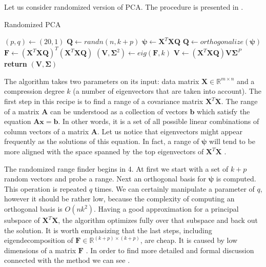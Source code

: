 Let us consider randomized version of PCA. The procedure is presented in  . 
\begin{algorithm}
    \caption{Randomized PCA}\label{alg:rpca1}
    \begin{algorithmic}[1]
        \State $(p,q) \gets (20,1)$
        \State $\boldsymbol{Q} \gets randn(n, k+p)$
                \State $\boldsymbol{\psi} \gets \boldsymbol{X}^T\boldsymbol{X}\boldsymbol{Q}$
                \State $\boldsymbol{Q} \gets orthogonalize(\boldsymbol{\psi})$
            \EndFor
            \State $\boldsymbol{F} \gets (\boldsymbol{X}^T\boldsymbol{X}\boldsymbol{Q})^T(\boldsymbol{X}^T\boldsymbol{X}\boldsymbol{Q})$
            \State $(\boldsymbol{V},\boldsymbol{\Sigma}^2) \gets eig(\boldsymbol{F},k)$
            \State $\boldsymbol{V} \gets (\boldsymbol{X}^T\boldsymbol{X}\boldsymbol{Q})\boldsymbol{V}\boldsymbol{\Sigma}^P$
            \State \textbf{return} $(\boldsymbol{V}, \boldsymbol{\Sigma})$
        \EndFunction
    \end{algorithmic}
\end{algorithm}
The algorithm takes two parameters on its input: data matrix $\boldsymbol{X} \in \mathbb{R}^{m \times n}$ and a compression degree $k$ (a number of eigenvectors that are taken into account). The first step in this recipe is to find a range of a covariance matrix $\boldsymbol{X}^T\boldsymbol{X}$. The range of a matrix $\boldsymbol{A}$ can be understood as a collection of vectors $\boldsymbol{b}$ which satisfy the equation $\boldsymbol{A}\boldsymbol{x}=\boldsymbol{b}$. In other words, it is a set of all possible linear combinations of column vectors of a matrix $\boldsymbol{A}$. Let us notice that eigenvectors might appear frequently as the solutions of this equation. In fact, a range of $\boldsymbol{\psi}$ will tend to be more aligned with the space spanned by the top eigenvectors of $\boldsymbol{X}^T\boldsymbol{X}$ \citep{Mineiro}.

The randomized range finder begins in 4. At first we start with a set of $k+p$ random vectors and probe a range. Next an orthogonal basis for $\boldsymbol{\psi}$ is computed. This operation is repeated $q$ times. We can certainly manipulate a parameter of $q$, however it should be rather low, because the complexity of computing an orthogonal basis is $O(nk^2)$. 
Having a good approximation for a principal subspace of $\boldsymbol{X}^T\boldsymbol{X}$, the algorithm optimizes fully over that subspace and back out the solution. It is worth emphasizing that the last steps, including eigendecomposition of $\boldsymbol{F} \in \mathbb{R}^{(k+p) \times (k+p)}$, are cheap. It is caused by low dimensions of a matrix $\boldsymbol{F}$ \citep{Mineiro}. In order to find more detailed and formal discussion connected with the method we can see \citep{Halko}.

